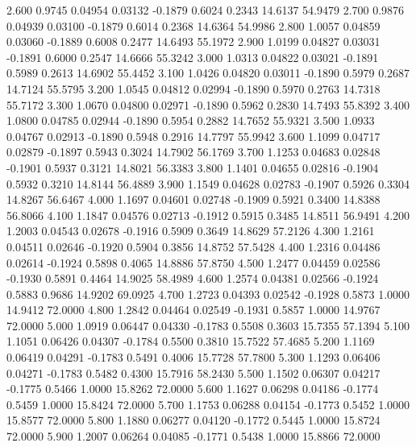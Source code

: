    2.600   0.9745   0.04954   0.03132  -0.1879   0.6024   0.2343  14.6137  54.9479
   2.700   0.9876   0.04939   0.03100  -0.1879   0.6014   0.2368  14.6364  54.9986
   2.800   1.0057   0.04859   0.03060  -0.1889   0.6008   0.2477  14.6493  55.1972
   2.900   1.0199   0.04827   0.03031  -0.1891   0.6000   0.2547  14.6666  55.3242
   3.000   1.0313   0.04822   0.03021  -0.1891   0.5989   0.2613  14.6902  55.4452
   3.100   1.0426   0.04820   0.03011  -0.1890   0.5979   0.2687  14.7124  55.5795
   3.200   1.0545   0.04812   0.02994  -0.1890   0.5970   0.2763  14.7318  55.7172
   3.300   1.0670   0.04800   0.02971  -0.1890   0.5962   0.2830  14.7493  55.8392
   3.400   1.0800   0.04785   0.02944  -0.1890   0.5954   0.2882  14.7652  55.9321
   3.500   1.0933   0.04767   0.02913  -0.1890   0.5948   0.2916  14.7797  55.9942
   3.600   1.1099   0.04717   0.02879  -0.1897   0.5943   0.3024  14.7902  56.1769
   3.700   1.1253   0.04683   0.02848  -0.1901   0.5937   0.3121  14.8021  56.3383
   3.800   1.1401   0.04655   0.02816  -0.1904   0.5932   0.3210  14.8144  56.4889
   3.900   1.1549   0.04628   0.02783  -0.1907   0.5926   0.3304  14.8267  56.6467
   4.000   1.1697   0.04601   0.02748  -0.1909   0.5921   0.3400  14.8388  56.8066
   4.100   1.1847   0.04576   0.02713  -0.1912   0.5915   0.3485  14.8511  56.9491
   4.200   1.2003   0.04543   0.02678  -0.1916   0.5909   0.3649  14.8629  57.2126
   4.300   1.2161   0.04511   0.02646  -0.1920   0.5904   0.3856  14.8752  57.5428
   4.400   1.2316   0.04486   0.02614  -0.1924   0.5898   0.4065  14.8886  57.8750
   4.500   1.2477   0.04459   0.02586  -0.1930   0.5891   0.4464  14.9025  58.4989
   4.600   1.2574   0.04381   0.02566  -0.1924   0.5883   0.9686  14.9202  69.0925
   4.700   1.2723   0.04393   0.02542  -0.1928   0.5873   1.0000  14.9412  72.0000
   4.800   1.2842   0.04464   0.02549  -0.1931   0.5857   1.0000  14.9767  72.0000
   5.000   1.0919   0.06447   0.04330  -0.1783   0.5508   0.3603  15.7355  57.1394
   5.100   1.1051   0.06426   0.04307  -0.1784   0.5500   0.3810  15.7522  57.4685
   5.200   1.1169   0.06419   0.04291  -0.1783   0.5491   0.4006  15.7728  57.7800
   5.300   1.1293   0.06406   0.04271  -0.1783   0.5482   0.4300  15.7916  58.2430
   5.500   1.1502   0.06307   0.04217  -0.1775   0.5466   1.0000  15.8262  72.0000
   5.600   1.1627   0.06298   0.04186  -0.1774   0.5459   1.0000  15.8424  72.0000
   5.700   1.1753   0.06288   0.04154  -0.1773   0.5452   1.0000  15.8577  72.0000
   5.800   1.1880   0.06277   0.04120  -0.1772   0.5445   1.0000  15.8724  72.0000
   5.900   1.2007   0.06264   0.04085  -0.1771   0.5438   1.0000  15.8866  72.0000

